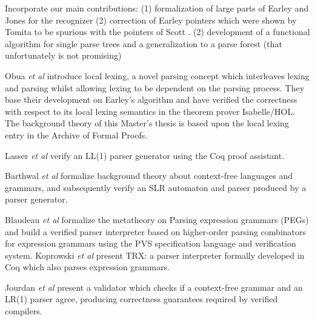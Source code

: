 \begin{isabellebody}
\begin{isamarkuptext}
Incorporate our main contributions:
(1) formalization of large parts of Earley \cite{Earley:1970} and Jones \cite{Jones:1972} for the recognizer
(2) correction of Earley pointers which were shown by Tomita \cite{Tomita:1985} to be spurious with the pointers of Scott \cite{Scott:2008}.
(2) development of a functional algorithm for single parse trees and a generalization to a parse forest
  (that unfortunately is not promising)%
\end{isamarkuptext}\isamarkuptrue%
%
\isadelimdocument
%
\endisadelimdocument
%
\isatagdocument
%
\isamarkuptrue%
%
\endisatagdocument
{\isafolddocument}%
%
\isadelimdocument
%
\endisadelimdocument
%
\begin{isamarkuptext}%
Obua \textit{et al} \cite{Obua:2017} introduce local lexing, a novel parsing concept which interleaves
lexing and parsing whilst allowing lexing to be dependent on the parsing process. They base their
development on Earley's algorithm and have verified the correctness with respect to its local lexing
semantics in the theorem prover Isabelle/HOL. The background theory of this Master's thesis is based
upon the local lexing entry \cite{LocalLexing-AFP} in the Archive of Formal Proofs.

Lasser \textit{et al} \cite{Lasser:2019} verify an LL(1) parser generator using the Coq proof assistant.

Barthwal \textit{et al} \cite{Barthwal:2009} formalize background theory
about context-free languages and grammars, and subsequently verify an SLR automaton and parser produced
by a parser generator.

Blaudeau \textit{et al} \cite{Blaudeau:2020} formalize the metatheory on Parsing expression grammars (PEGs) and
build a verified parser interpreter based on higher-order parsing combinators for expression grammars
using the PVS specification language and verification system. Koprowski \textit{et al} \cite{Koprowski:2011}
present TRX: a parser interpreter formally developed in Coq which also parses expression grammars.

Jourdan \textit{et al} \cite{Jourdan:2012} present a validator which checks if a context-free grammar
and an LR(1) parser agree, producing correctness guarantees required by verified compilers.


\end{isamarkuptext}
\end{isabellebody}
